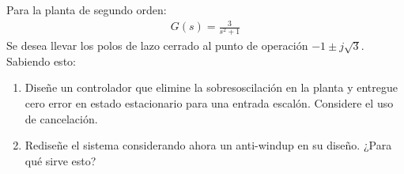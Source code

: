 \documentclass[
  11pt,
  letterpaper,
   addpoints,
   answers
  ]{exam}
\begin{document}
\begin{questions}
    \question Para la planta de segundo orden:
    \begin{align}
        G(s) = \frac{3}{s^2 + 1}
    \end{align}
   Se desea llevar los polos de lazo cerrado al punto de operación \( -1 \pm j \sqrt{3} \). Sabiendo esto:
    \begin{enumerate}
        \item Diseñe un controlador que elimine la sobresoscilación en la planta y entregue cero error en estado estacionario para una entrada escalón. Considere el uso de cancelación.
        \item Rediseñe el sistema considerando ahora un anti-windup en su diseño. ¿Para qué sirve esto?
    \end{enumerate}
\begin{solution}

\end{solution}
\end{questions}
\end{document}
